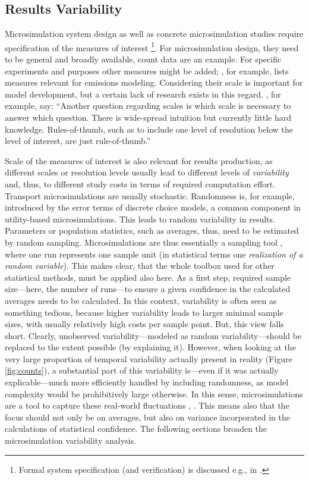 \subsection{Results Variability}
\label{sec:variability}
Microsimulation system design as well as concrete microsimulation studies require specification of the measures of interest \footnote{
Formal system specification (and verification) is discussed e.g., in \citet[][]{FisherWooldridge_IJCIS_1997, BourahlaBenmohamed_ENTCS_2005}. 
}. For microsimulation design, they need to be general and broadly available, count data are an example. For specific experiments and purposes other measures might be added; \citet[][]{Kitamura_TMIP_1996}, for example, lists measures relevant for emissions modeling. Considering their scale is important for model development, but a certain lack of research exists in this regard. \citet[][Section 2.2]{NagelAxhausen_TechRep_IVT_2001}, for example, say: ``Another question regarding scales is which scale is necessary to answer which question. There is wide-spread intuition but currently little hard knowledge. Rules-of-thumb, such as to include one level of resolution below the level of interest, are just rule-of-thumb.'' 

Scale of the measures of interest is also relevant for results production, as different scales or resolution levels usually lead to different levels of \emph{variability} and, thus, to different study costs in terms of required computation effort. Transport microsimulations are usually stochastic. Randomness is, for example, introduced by the error terms of discrete choice models, a common component in utility-based microsimulations. This leads to random variability in results. Parameters or population statistics, such as averages, thus, need to be estimated by random sampling. Microsimulations are thus essentially a sampling tool \citep[][]{WolfDA_CSP_2001}, where one run represents one sample unit (in statistical terms one \emph{realization of a random variable}). This makes clear, that the whole toolbox used for other statistical methods, must be applied also here. As a first step, required sample size---here, the number of runs---to ensure a given confidence in the calculated averages needs to be calculated. In this context, variability is often seen as something tedious, because higher variability leads to larger minimal sample sizes, with usually relatively high costs per sample point. But, this view falls short. Clearly, unobserved variability---modeled as random variability---should be replaced to the extent possible (by explaining it). However, when looking at the very large proportion of temporal variability actually present in reality (Figure \ref{fig:counts}), a substantial part of this variability is---even if it was actually explicable---much more efficiently handled by including randomness, as model complexity would be prohibitively large otherwise. In this sense, microsimulations are a tool to capture these real-world fluctuations \citep[][p.11]{NewmanMEJBarkema_1999}, \citep[][p.704]{EsserNagel_Hensher_2001}. This means also that the focus should not only be on averages, but also on variance incorporated in the calculations of statistical confidence. The following sections broaden the microsimulation variability analysis.

